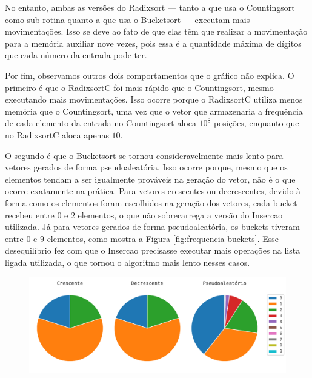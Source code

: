 No entanto, ambas as versões do Radixsort — tanto a que usa o Countingsort como sub-rotina quanto a que usa o Bucketsort — executam mais movimentações. Isso se deve ao fato de que elas têm que realizar a movimentação para a memória auxiliar nove vezes, pois essa é a quantidade máxima de dígitos que cada número da entrada pode ter.

Por fim, observamos outros dois comportamentos que o gráfico não explica. O primeiro é que o RadixsortC foi mais rápido que o Countingsort, mesmo executando mais movimentações. Isso ocorre porque o RadixsortC utiliza menos memória que o Countingsort, uma vez que o vetor que armazenaria a frequência de cada elemento da entrada no Countingsort aloca $10^8$ posições, enquanto que no RadixsortC aloca apenas $10$.

O segundo é que o Bucketsort se tornou consideravelmente mais lento para vetores gerados de forma pseudoaleatória. Isso ocorre porque, mesmo que os elementos tendam a ser igualmente prováveis na geração do vetor, não é o que ocorre exatamente na prática. Para vetores crescentes ou decrescentes, devido à forma como os elementos foram escolhidos na geração dos vetores, cada bucket recebeu entre $0$ e $2$ elementos, o que não sobrecarrega a versão do Insercao utilizada. Já para vetores gerados de forma pseudoaleatória, os buckets tiveram entre $0$ e $9$ elementos, como mostra a Figura \ref{fig:frequencia-buckets}. Esse desequilíbrio fez com que o Insercao precisasse executar mais operações na lista ligada utilizada, o que tornou o algoritmo mais lento nesses casos.

\begin{figure}[H]
\centering
\includegraphics[scale=0.787]{figuras/pdf/frequencia_buckets.pdf}
\end{figure}
